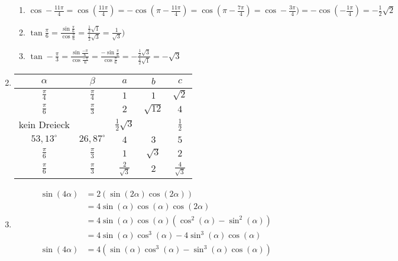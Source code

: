 \begin{enumerate}
\begin{enumerate}
   \item $\cos -\frac{11\pi}{4} = \cos (\frac{11\pi}{4}) = - \cos(\pi - \frac{11\pi}{4}) = \cos (\pi - \frac{7\pi}{4}) = \cos -\frac{3\pi}{4}) = - \cos( -\frac{1\pi}{4}) = - \frac{1}{2}\sqrt{2}$
   \item $\tan \frac{\pi}{6} = \frac{\sin \frac{\pi}{6}}{\cos \frac{\pi}{6}} = \frac{\frac{1}{2} \sqrt{1}}{\frac{1}{2} \sqrt{3}}= \frac{1}{\sqrt{3}})$
   \item $\tan -\frac{\pi}{3}= \frac{\sin \frac{-\pi}{6}}{\cos \frac{-\pi}{6}}=\frac{-\sin \frac{\pi}{6}}{\cos \frac{\pi}{6}} = - \frac{\frac{1}{2}\sqrt{3}}{\frac{1}{2}\sqrt{1}} = - \sqrt{3}$
  \end{enumerate}
  
  



\item


\begin{tabular}{ccccc}
$\alpha$ & $\beta$ & $a$ & $b$ & $c$ \\
\hline

$\frac{\pi}{4}$ & $\frac{\pi}{4}$ & $1$ & $1$ & $\sqrt{2}$ \\
$\frac{\pi}{6}$ & $\frac{\pi}{3}$ & $2$ & $\sqrt{12}$ & $4$\\ 
kein Dreieck &  & $\frac{1}{2}\sqrt{3}$ &  & $\frac{1}{2}$\\
$53,13^\circ$ & $26,87^\circ$ & $4$ & $3$ & $5$ \\
$\frac{\pi}{6}$ & $\frac{\pi}{3}$ & $1$ & $\sqrt{3}$ & $2$ \\
$\frac{\pi}{6}$ & $\frac{\pi}{3}$ & $\frac{2}{\sqrt{3}}$ & $2$ & $\frac{4}{\sqrt{3}}$ \\

\end{tabular}
 
\item
 \begin{align*}
 \sin(4\alpha) & = 2 (\sin(2\alpha) \cos(2\alpha)) \\
 							 & = 4 \sin(\alpha) \cos(\alpha) \cos(2\alpha) \\
 							 & = 4 \sin (\alpha) \cos (\alpha) (\cos^2(\alpha) - \sin^2 (\alpha)) \\
 							 & = 4 \sin (\alpha) \cos^{3} (\alpha) - 4 \sin ^{3} (\alpha) \cos (\alpha)	\\
 	\sin(4\alpha) & = 4 (\sin (\alpha) \cos^{3} (\alpha) - \sin ^{3} (\alpha) \cos (\alpha))	\\
 \end{align*}
 

\end{enumerate}
